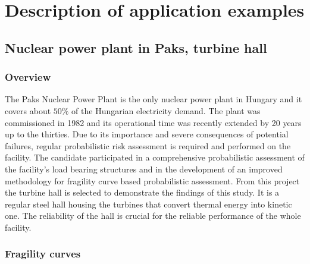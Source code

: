 
\chapter{Description of application examples}

\ifpdf
    \graphicspath{{Appendix2/Figs/Raster/}{Appendix2/Figs/PDF/}{Appendix2/Figs/}}
\else
    \graphicspath{{Appendix2/Figs/Vector/}{Appendix2/Figs/}}
\fi

\section{Nuclear power plant in Paks, turbine hall}
\label{sec:paks}

\subsection{Overview}

The Paks Nuclear Power Plant is the only nuclear power plant in Hungary and it covers about $50 \%$ of the Hungarian electricity demand. The plant was commissioned in 1982 and its operational time was recently extended by 20 years up to the thirties. Due to its importance and severe consequences of potential failures, regular probabilistic risk assessment is required and performed on the facility. The candidate participated in a comprehensive probabilistic assessment of the facility's load bearing structures and in the development of an improved methodology for fragility curve based probabilistic assessment. From this project the turbine hall is selected to demonstrate the findings of this study. It is a regular steel hall housing the turbines that convert thermal energy into kinetic one. The reliability of the hall is crucial for the reliable performance of the whole facility.

\subsection{Fragility curves}

